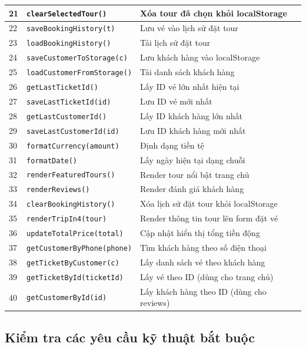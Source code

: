 \documentclass[12pt,a4paper]{article}
\begin{document}
\begin{table}[H]
\begin{tabularx}{\textwidth}{|l|l|X|}
\hline
21 & \texttt{clearSelectedTour()}      & Xóa tour đã chọn khỏi localStorage \\
\hline
22 & \texttt{saveBookingHistory(t)}    & Lưu vé vào lịch sử đặt tour \\
\hline
23 & \texttt{loadBookingHistory()}     & Tải lịch sử đặt tour \\
\hline
24 & \texttt{saveCustomerToStorage(c)} & Lưu khách hàng vào localStorage \\
\hline
25 & \texttt{loadCustomerFromStorage()}& Tải danh sách khách hàng \\
\hline
26 & \texttt{getLastTicketId()}        & Lấy ID vé lớn nhất hiện tại \\
\hline
27 & \texttt{saveLastTicketId(id)}     & Lưu ID vé mới nhất \\
\hline
28 & \texttt{getLastCustomerId()}      & Lấy ID khách hàng lớn nhất \\
\hline
29 & \texttt{saveLastCustomerId(id)}   & Lưu ID khách hàng mới nhất \\
\hline
30 & \texttt{formatCurrency(amount)}   & Định dạng tiền tệ \\
\hline
31 & \texttt{formatDate()}             & Lấy ngày hiện tại dạng chuỗi \\
\hline
32 & \texttt{renderFeaturedTours()}    & Render tour nổi bật trang chủ \\
\hline
33 & \texttt{renderReviews()}          & Render đánh giá khách hàng \\
\hline
34 & \texttt{clearBookingHistory()}    & Xóa lịch sử đặt tour khỏi localStorage \\
\hline
35 & \texttt{renderTripIn4(tour)}      & Render thông tin tour lên form đặt vé \\
\hline
36 & \texttt{updateTotalPrice(total)}  & Cập nhật hiển thị tổng tiền động \\
\hline
37 & \texttt{getCustomerByPhone(phone)}& Tìm khách hàng theo số điện thoại \\
\hline
38 & \texttt{getTicketByCustomer(c)}   & Lấy danh sách vé theo khách hàng \\
\hline
39 & \texttt{getTicketById(ticketId)}  & Lấy vé theo ID (dùng cho trang chủ) \\
\hline
40 & \texttt{getCustomerById(id)}      & Lấy khách hàng theo ID (dùng cho reviews) \\
\hline
\end{tabularx}
\end{table}

\subsection{Kiểm tra các yêu cầu kỹ thuật bắt buộc}
\end{document}
